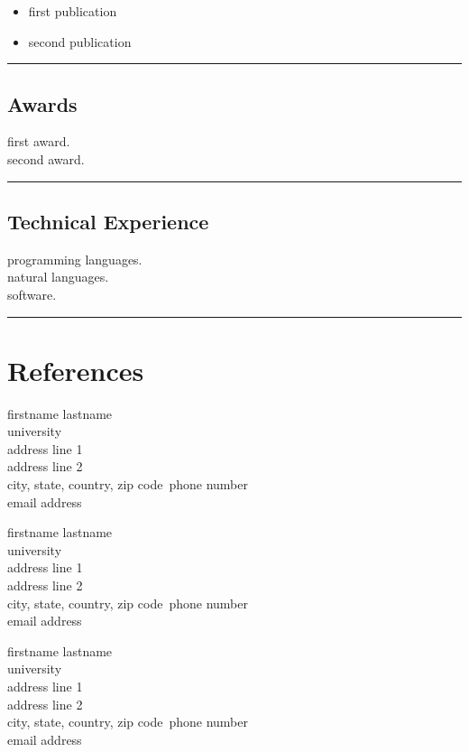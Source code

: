 \documentclass[10pt,letterpaper]{article}
\makeatletter
\newcommand{\headerrow}[2]
{\begin{tabular*}{\linewidth}{l@{\extracolsep{\fill}}r}
	#1 &
	#2 \\
\end{tabular*}}
\makeatother
\begin{document}
\begin{itemize}
    \parskip=0.1em

    \item first publication

	\item second publication

\end{itemize}

\hrule
\vspace{-0.4em}
\subsection*{Awards}
	\headerrow
        {first award.}
    ~\\
        {second award.}
    ~\\
\hrule
\vspace{-0.4em}
\subsection*{Technical Experience}
	\headerrow
		{programming languages.}
	~\\
	\headerrow
		{natural languages.}
	~\\
	\headerrow
		{software.}
	~\\
\hrule
\vspace{-0.4em}
\pagebreak
\section*{References}
\begin{multicols}{3}

    \noindent
    firstname lastname\\
    university\\
    address line 1\\
	address line 2\\
	city, state, country, zip code\
    phone number\\
    email address\\

\vfill\columnbreak

    \noindent
    firstname lastname\\
    university\\
    address line 1\\
	address line 2\\
	city, state, country, zip code\
    phone number\\
    email address\\

\vfill\columnbreak

    \noindent
    firstname lastname\\
    university\\
    address line 1\\
	address line 2\\
	city, state, country, zip code\
    phone number\\
    email address\\

\end{multicols}
\end{document}

